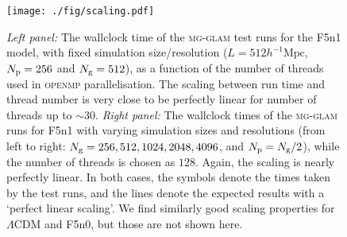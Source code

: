 \begin{figure}
    \centering 
    \texttt{[image: ./fig/scaling.pdf]}
    \caption{
        \textit{Left panel:} The wallclock time of the \textsc{mg-glam} test runs for the F5n1 model, with fixed simulation size/resolution ($L=512h^{-1}\mathrm{Mpc}$, $N_{\rm p} = 256$ and $N_{\rm g} = 512$), as a function of the number of threads used in \textsc{openmp} parallelisation.
        The scaling between run time and thread number is very close to be perfectly linear for number of threads up to $\sim 30$.
        \textit{Right panel:} The wallclock times of the \textsc{mg-glam} runs for F5n1 with varying simulation sizes and resolutions (from left to right: $N_{\rm g} = 256, 512, 1024, 2048, 4096$, and $N_{\rm p} = N_{\rm g}/2$), while the number of threads is chosen as $128$. Again, the scaling is nearly perfectly linear. In both cases, the symbols denote the times taken by the test runs, and the lines denote the expected results with a `perfect linear scaling'. We find similarly good scaling properties for $\Lambda$CDM and F5n0, but those are not shown here.
    }
    \label{fig:scaling}
\end{figure}
